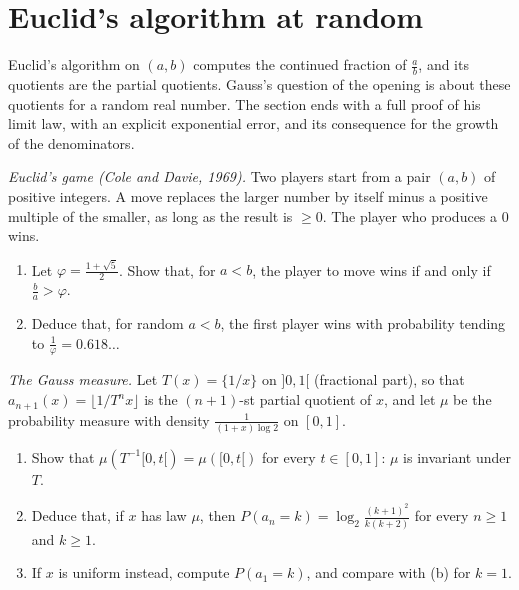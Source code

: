 \section{Euclid's algorithm at random}

Euclid's algorithm on $(a,b)$ computes the continued fraction of $\frac ab$, and its quotients are the partial quotients. Gauss's
question of the opening is about these quotients for a random real number. The section ends with a full proof of his limit law,
with an explicit exponential error, and its consequence for the growth of the denominators.

\begin{exercise}[$\star\star$]\label{pb:euclidgame}
\emph{Euclid's game (Cole and Davie, 1969).} Two players start from a pair $(a,b)$ of positive integers. A move replaces the larger
number by itself minus a positive multiple of the smaller, as long as the result is $\ge0$. The player who produces a $0$ wins.
\begin{enumerate}[label=(\alph*)]
\item Let $\varphi=\frac{1+\sqrt5}2$. Show that, for $a<b$, the player to move wins if and only if $\frac ba>\varphi$.
\item Deduce that, for random $a<b$, the first player wins with probability tending to $\frac1\varphi=0.618\ldots$
\end{enumerate}
\end{exercise}

\begin{exercise}[$\star$]\label{pb:gaussmeasure}
\emph{The Gauss measure.} Let $T(x)=\{1/x\}$ on $]0,1[$ (fractional part), so that $a_{n+1}(x)=\lfloor1/T^nx\rfloor$ is the
$(n+1)$-st partial quotient of $x$, and let $\mu$ be the probability measure with density $\frac1{(1+x)\log2}$ on $[0,1]$.
\begin{enumerate}[label=(\alph*)]
\item Show that $\mu(T^{-1}[0,t[)=\mu([0,t[)$ for every $t\in[0,1]$: $\mu$ is invariant under $T$.
\item Deduce that, if $x$ has law $\mu$, then $P(a_n=k)=\log_2\frac{(k+1)^2}{k(k+2)}$ for every $n\ge1$ and $k\ge1$.
\item If $x$ is uniform instead, compute $P(a_1=k)$, and compare with (b) for $k=1$.
\end{enumerate}
\end{exercise}

